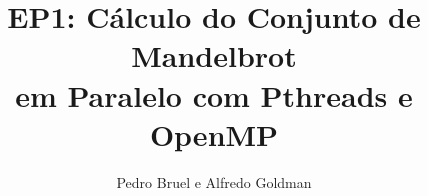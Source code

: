 \documentclass[final,12pt,a4paper]{elsarticle}
\begin{document}
\begin{frontmatter}


\title{EP1: Cálculo do Conjunto de Mandelbrot \\ em Paralelo com Pthreads e OpenMP}




\author{Pedro Bruel e Alfredo Goldman}

\address{MAC 5742-0219 Introdução à Programação Concorrente, Paralela e Distribuída}




\end{frontmatter}
\end{document}
